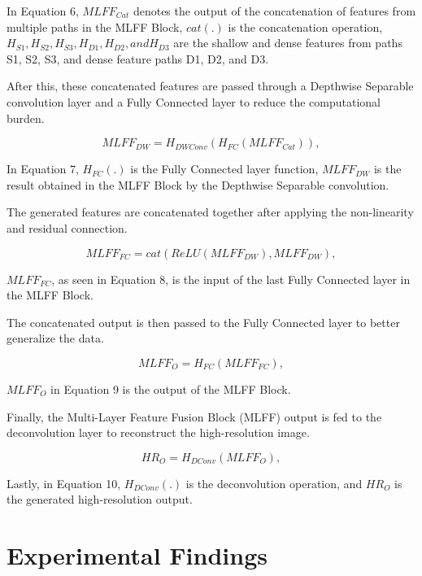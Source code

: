 \documentclass[twocolumn]{svjour3}          %
\begin{document}
In Equation 6, ${MLFF_{Cat}}$ denotes the output of the concatenation of features from multiple paths in the MLFF Block, ${cat}$$(.)$ is the concatenation operation, ${H_{S1}},{H_{S2}},{H_{S3}},{H_{D1}},{H_{D2}}, and {H_{D3}}$ are the shallow and dense features from paths S1, S2, S3, and dense feature paths D1, D2, and D3. 

After this, these concatenated features are passed through a Depthwise Separable convolution layer and a Fully Connected layer to reduce the computational burden.

\begin{equation}
{MLFF_{DW}}= {H_{DWConv}}({H_{FC}}({MLFF_{Cat}})),
\end{equation}

In Equation 7, ${H_{FC}}$$(.)$ is the Fully Connected layer function, ${MLFF_{DW}}$ is the result obtained in the MLFF Block by the Depthwise Separable convolution.

The generated features are concatenated together after applying the non-linearity and residual connection.

\begin{equation}
{MLFF_{FC}}= {cat}({ReLU}({MLFF_{DW}}), {MLFF_{DW}}),
\end{equation}

${MLFF_{FC}}$, as seen in Equation 8, is the input of the last Fully Connected layer in the MLFF Block.

The concatenated output is then passed to the Fully Connected layer to better generalize the data.

\begin{equation}
{MLFF_{O}}= {H_{FC}}({MLFF_{FC}}),
\end{equation}

${MLFF_{O}}$ in Equation 9 is the output of the MLFF Block.

Finally, the Multi-Layer Feature Fusion Block (MLFF) output is fed to the deconvolution layer to reconstruct the high-resolution image.

\begin{equation}
{HR_{O}}= {H_{DConv}}({MLFF_{O}}),
\end{equation}

Lastly, in Equation 10, ${H_{DConv}}$$(.)$ is the deconvolution operation, and ${HR_{O}}$ is the generated high-resolution output.

\section{Experimental Findings}
\end{document}
